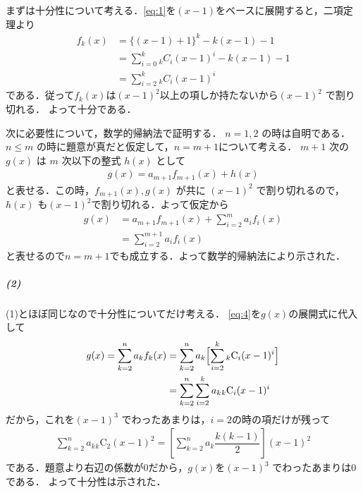 \documentclass[../../main.tex]{subfiles}
\begin{document}
まずは十分性について考える．\cref{eq:1}を$(x-1)$をベースに展開すると，二項定理より
\begin{align}
  f_k(x)
  &= \{(x-1)+1\}^k - k(x-1) - 1 \\
  &= \sum_{i=0}^{k}{}_{k}C_{i}(x-1)^{i} - k(x-1) - 1 \\
  &= \sum_{i=2}^{k}{}_{k}C_{i}(x-1)^{i} \label{eq:4}
\end{align}
である．従って$f_k(x)$は$(x-1)^2$以上の項しか持たないから$(x-1)^2$ で割り切れる．
よって十分である．

次に必要性について，数学的帰納法で証明する．
$n=1,2$ の時は自明である．
$n \le m$ の時に題意が真だと仮定して，$n=m+1$について考える．
$m+1$ 次の $g(x)$ は $m$ 次以下の整式 $h(x)$ として
\begin{align}
  g(x) = a_{m+1} f_{m+1}(x) + h(x)
\end{align}
と表せる．この時，$f_{m+1}(x), g(x)$ が共に $(x-1)^2$ で割り切れるので，$h(x)$ も$(x-1)^2$で割り切れる．よって仮定から
\begin{align}
  g(x)
  &= a_{m+1} f_{m+1}(x) + \sum_{i=2}^{m}a_{i}f_{i}(x) \\
  &= \sum_{i=2}^{m+1}a_{i}f_{i}(x)
\end{align}
と表せるので$n=m+1$でも成立する．よって数学的帰納法により示された．

\subparagraph{(2)}

(1)とほぼ同じなので十分性についてだけ考える．
\cref{eq:4}を$g(x)$の展開式に代入して
\begin{align}
  g(x)=\sum_{k=2}^n a_k f_k(x)
  &= \sum_{k=2}^n a_k \Bigl[ \sum_{i=2}^k {}_k\mathrm{C}_i (x-1)^i \Bigr] \\
  &=\sum_{k=2}^n\sum_{i=2}^k a_k{}_k\mathrm{C}_i (x-1)^i
\end{align}
だから，これを$(x-1)^3$ でわったあまりは，$i=2$の時の項だけが残って
\begin{align}
  \sum_{k=2}^n a_k{}_k\mathrm{C}_2 (x-1)^2
  = \left[\sum_{k=2}^n a_k\dfrac{k(k-1)}{2}\right] (x-1)^2
\end{align}
である．題意より右辺の係数が$0$だから，$g(x)$を$(x-1)^3$ でわったあまりは$0$である．
よって十分性は示された．


\end{document}
